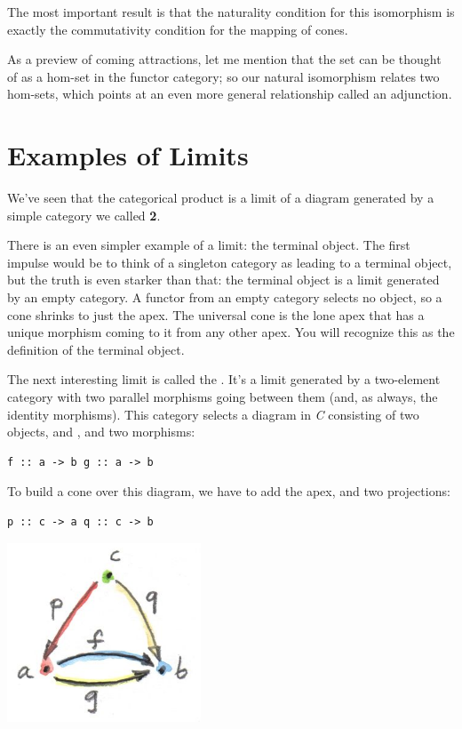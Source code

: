 The most important result is that the naturality condition for this
isomorphism is exactly the commutativity condition for the mapping of
cones.

As a preview of coming attractions, let me mention that the set
 can be thought of as a hom-set in the functor
category; so our natural isomorphism relates two hom-sets, which points
at an even more general relationship called an adjunction.

\section{Examples of Limits}\label{examples-of-limits}

We've seen that the categorical product is a limit of a diagram
generated by a simple category we called \textbf{2}.

There is an even simpler example of a limit: the terminal object. The
first impulse would be to think of a singleton category as leading to a
terminal object, but the truth is even starker than that: the terminal
object is a limit generated by an empty category. A functor from an
empty category selects no object, so a cone shrinks to just the apex.
The universal cone is the lone apex that has a unique morphism coming to
it from any other apex. You will recognize this as the definition of the
terminal object.

The next interesting limit is called the . It's a limit
generated by a two-element category with two parallel morphisms going
between them (and, as always, the identity morphisms). This category
selects a diagram in \emph{C} consisting of two objects,  and
, and two morphisms:

\begin{verbatim}
f :: a -> b g :: a -> b
\end{verbatim}

To build a cone over this diagram, we have to add the apex, 
and two projections:

\begin{verbatim}
p :: c -> a q :: c -> b
\end{verbatim}

\includegraphics[width=2.27083in]{images/equalizercone.jpg}

